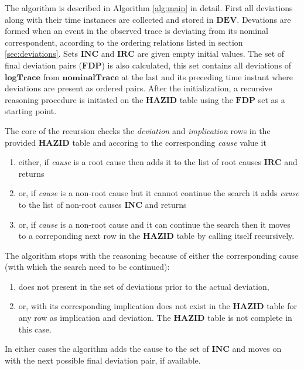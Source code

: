 \documentclass[conference]{IEEEtran}
\begin{document}
The algorithm is described in Algorithm \ref{alg:main} in detail. First all deviations along with their time instances are collected and stored in $\mathbf{DEV}$. Devations are formed when an event in the observed trace is deviating from its nominal correspondent, according to the ordering relations listed in section \ref{sec:deviations}. Sets $\mathbf{INC}$ and $\mathbf{IRC}$ are given empty initial values. The set of final deviation pairs ($\mathbf{FDP}$) is also calculated, this set contains all deviations of $\mathbf{logTrace}$ from $\mathbf{nominalTrace}$ at the last and its preceding time instant where deviations are present as ordered pairs. After the initialization, a recursive reasoning procedure is initiated on the $\mathbf{HAZID}$ table using the $\mathbf{FDP}$ set as a starting point.

The core of the recursion checks the \textit{deviation} and \textit{implication} rows in the provided $\mathbf{HAZID}$ table and accoring to the corresponding \textit{cause} value it
\begin{enumerate}
\item either, if \textit{cause} is a root cause then adds it to the list of root causes $\mathbf{IRC}$ and returns
\item or, if \textit{cause} is a non-root cause but it cannot continue the search it adds \textit{cause} to the list of non-root causes $\mathbf{INC}$ and returns
\item or, if \textit{cause} is a non-root cause and it can continue the search then it moves to a correponding next row in the $\mathbf{HAZID}$ table by calling itself recursively.
\end{enumerate}

The algorithm stops with the reasoning because of either the corresponding cause (with which the search need to be continued):
\begin{enumerate}
\item does not present in the set of deviations prior to the actual deviation,
\item or, with its corresponding implication does not exist in the $\mathbf{HAZID}$ table for any row as implication and deviation. The $\mathbf{HAZID}$ table is not complete in this case.
\end{enumerate}

In either cases the algorithm adds the cause to the set of $\mathbf{INC}$ and moves on with the next possible final deviation pair, if available.
\end{document}
